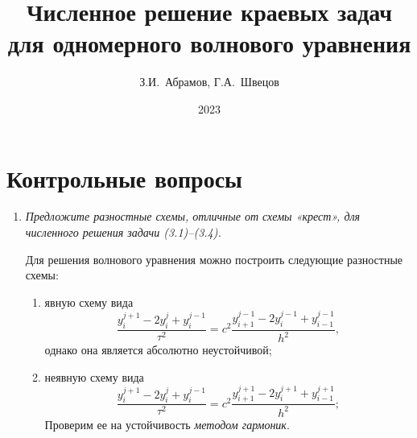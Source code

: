 \documentclass[12pt, a4paper]{article}
\title{Численное решение краевых задач для одномерного волнового уравнения}
\author{З.И.~Абрамов, Г.А.~Швецов}
\date{2023}
\begin{document}
	\newcommand{\pl}{\partial}
	\maketitle
	
	\tableofcontents
	
	\newpage
	
	\section{Контрольные вопросы}
	\begin{enumerate}
		\item \textit{Предложите разностные схемы, отличные от схемы «крест», для численного решения задачи (3.1)–(3.4).}
		\smallskip
		
		Для решения волнового уравнения можно построить следующие разностные схемы:
		\begin{enumerate}
			\item явную схему вида
			\[
			\frac{y_i^{j+1} - 2y_i^j + y_i^{j-1}}{\tau^2} = c^2 \frac{y_{i+1}^{j-1} -2 y_i^{j-1} + y_{i-1}^{j-1}}{h^2},			
			\]
			однако она является абсолютно неустойчивой;
			\item неявную схему вида
			\[
			\frac{y_i^{j+1} - 2y_i^j + y_i^{j-1}}{\tau^2} = c^2 \frac{y_{i+1}^{j+1} -2 y_i^{j+1} + y_{i-1}^{j+1}}{h^2};
			\]
			Проверим ее на устойчивость \textit{методом гармоник}.
			

\end{enumerate}
\end{enumerate}
\end{document}
